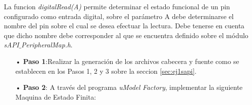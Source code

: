\documentclass[12pt,letterpaper]{article}
\begin{document}
La funcion \textit{digitalRead(A)} permite determinar el estado funcional de un pin configurado como entrada digital, sobre el parámetro A debe determinarse el nombre del pin sobre el cual se desea efectuar la lectura. Debe tenerse en cuenta que dicho nombre debe corresponder al que se encuentra definido sobre el módulo \textit{sAPI$\_$PeripheralMap.h}.

\begin{enumerate}
\item[•]\textbf{Paso 1}:Realizar la generación de los archivos cabecera y fuente como se establecen en los Pasos 1, 2 y 3 sobre la seccion \ref{sec:ej1sapi}.

\item[•]\textbf{Paso 2}: A través del programa \textit{uModel Factory}, implementar la siguiente Maquina de Estado Finita:


\end{enumerate}
\end{document}
